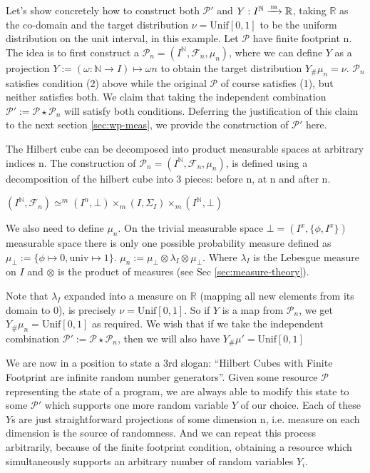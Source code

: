 Let's show concretely how to construct both $\mathcal{P'}$ and $Y : I^\mathbb{N} \xrightarrow{\,\mathrm{m}\,} \mathbb{R}$, taking $\mathbb{R}$ as the co-domain and
the target distribution $\nu=\mathrm{Unif}[0,1]$ to be the uniform distribution on the unit interval,
in this example. Let $\mathcal{P}$ have finite footprint n. The idea is to first construct a $\mathcal{P}_n = (I^\mathbb{N}, \mathcal{F}_n, \mu_n)$, 
where we can define $Y$ as a projection  $Y := (\omega : \mathbb{N} \to I) \mapsto \omega n$ to obtain the target distribution $Y_\#\mu_n = \nu$.
$\mathcal{P}_n$ satisfies condition (2) above while the original $\mathcal{P}$ of course satisfies (1), but neither satisfies both. We claim that taking the
independent combination $\mathcal{P'} := \mathcal{P} \star \mathcal{P}_n$ will satisfy both conditions. Deferring the justification of this claim to
the next section \ref{sec:wp-meas}, we provide the construction of $\mathcal{P'}$ here.

The Hilbert cube can be decomposed into product measurable spaces
at arbitrary indices n. The construction of $\mathcal{P}_n = (I^\mathbb{N}, \mathcal{F}_n, \mu_n)$, is defined using a decomposition of the hilbert cube
into 3 pieces: before n, at n and after n.

$(I^\mathbb{N}, \mathcal{F}_n) \simeq^m (I^n, \bot) \times_m (I, \Sigma_I) \times_m (I^\mathbb{N}, \bot)$

We also need to define $\mu_n$. On the trivial measurable space $\bot = (I^x, \{\phi, I^x\})$ measurable space there is only one possible probability measure defined as $\mu_\bot := \{\phi \mapsto 0, \mathrm{univ} \mapsto 1\}$.
$\mu_n := \mu_\bot \otimes \lambda_I \otimes \mu_\bot$. Where $\lambda_I$ is the Lebesgue measure on $I$ and $\otimes$ is the product of measures (see Sec \ref{sec:measure-theory}).

Note that $\lambda_I$ expanded into a measure on $\mathbb{R}$ (mapping all new elements from its domain to 0), is precisely $\nu=\mathrm{Unif}[0,1]$. So if $Y$ is a map from
$\mathcal{P}_n$, we get $Y_\#\mu_n = \mathrm{Unif[0,1]}$ as required. We wish that if we take the independent combination $\mathcal{P'} := \mathcal{P} \star \mathcal{P}_n$,
then we will also have $Y_\#\mu' = \mathrm{Unif[0,1]}$

We are now in a position to state a 3rd slogan: ``Hilbert Cubes with Finite Footprint are infinite random number generators''. Given some resource $\mathcal{P}$ representing
the state of a program, we are always able to modify this state to some $\mathcal{P'}$ which supports one more random variable $Y$ of our choice. Each of these $Y$s are
just straightforward projections of some dimension n, i.e. measure on each dimension is the source of randomness. And we can repeat this process arbitrarily, because
of the finite footprint condition, obtaining a resource
which simultaneously supports an arbitrary number of random variables $Y_i$.


